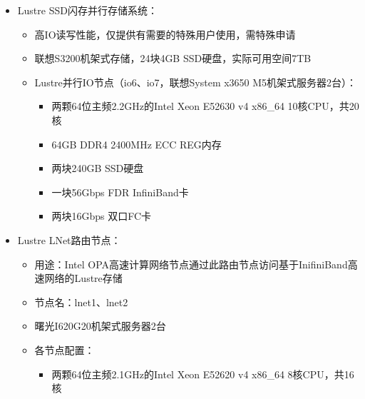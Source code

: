 \documentclass[a4paper,12pt,english]{sphinxmanual}
\begin{document}
\begin{itemize}
\begin{itemize}
\begin{itemize}
\begin{itemize}
\end{itemize}

\end{itemize}

\item {} 
\sphinxAtStartPar
Lustre SSD闪存并行存储系统：
\begin{itemize}
\item {} 
\sphinxAtStartPar
高IO读写性能，仅提供有需要的特殊用户使用，需特殊申请

\item {} 
\sphinxAtStartPar
联想S3200机架式存储，24块4GB SSD硬盘，实际可用空间7TB

\item {} 
\sphinxAtStartPar
Lustre并行IO节点（io6、io7，联想System x3650
M5机架式服务器2台）：
\begin{itemize}
\item {} 
\sphinxAtStartPar
两颗64位主频2.2GHz的Intel Xeon E5\sphinxhyphen{}2630 v4 x86\_64
10核CPU，共20核

\item {} 
\sphinxAtStartPar
64GB DDR4 2400MHz ECC REG内存

\item {} 
\sphinxAtStartPar
两块240GB SSD硬盘

\item {} 
\sphinxAtStartPar
一块56Gbps FDR InfiniBand卡

\item {} 
\sphinxAtStartPar
两块16Gbps 双口FC卡

\end{itemize}

\end{itemize}

\item {} 
\sphinxAtStartPar
Lustre LNet路由节点：
\begin{itemize}
\item {} 
\sphinxAtStartPar
用途：Intel
OPA高速计算网络节点通过此路由节点访问基于InifiniBand高速网络的Lustre存储

\item {} 
\sphinxAtStartPar
节点名：lnet1、lnet2

\item {} 
\sphinxAtStartPar
曙光I620\sphinxhyphen{}G20机架式服务器2台

\item {} 
\sphinxAtStartPar
各节点配置：
\begin{itemize}
\item {} 
\sphinxAtStartPar
两颗64位主频2.1GHz的Intel Xeon E5\sphinxhyphen{}2620 v4 x86\_64
8核CPU，共16核


\end{itemize}
\end{itemize}
\end{itemize}
\end{itemize}
\end{document}

